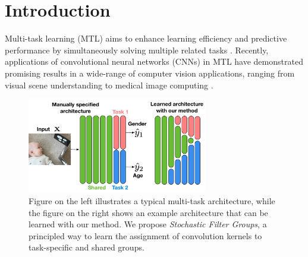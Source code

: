\section{Introduction}
Multi-task learning (MTL) aims to enhance learning efficiency and predictive performance by simultaneously solving multiple related tasks \cite{caruana1997multitask}. Recently, applications of convolutional neural networks (CNNs) in MTL have demonstrated promising results in a wide-range of computer vision applications, ranging from visual scene understanding \cite{sermanet2014overfeat,eigen2015predicting,MisraCrossMTL16,kokkinos2017ubernet,ranjan2019hyperface,bilen2016integrated} to medical image computing \cite{moeskops2016deep,chen2016bridging,bragman2018multi,tanno2018autodvt}. 

\begin{figure}[t]
\centering 
\includegraphics[width=0.7\textwidth]{chapter_6/figures/intro_2.pdf}
\caption{\small Figure on the left illustrates a typical multi-task architecture, while the figure on the right shows an example architecture that can be learned with our method. We propose \emph{Stochastic Filter Groups}, a principled way to learn the assignment of convolution kernels to task-specific and shared groups. }
\label{fig:intro}
\vspace{-4mm}
\end{figure}

